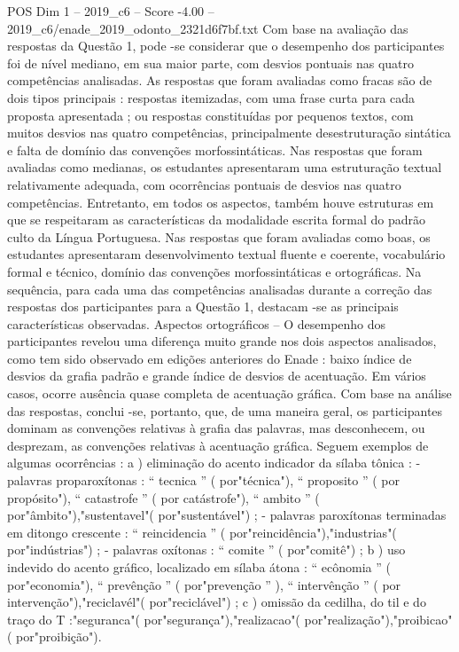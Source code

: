 \begin{textsample}{POS Dim 1 – 2019\_c6 – Score -4.00 – 2019\_c6/enade\_2019\_odonto\_2321d6f7bf.txt}
Com base na avaliação das respostas da Questão 1, pode -se considerar que o desempenho dos participantes foi de nível mediano, em sua maior parte, com desvios pontuais nas quatro competências analisadas.
As respostas que foram avaliadas como fracas são de dois tipos principais : respostas itemizadas, com uma frase curta para cada proposta apresentada ; ou respostas constituídas por pequenos textos, com muitos desvios nas quatro competências, principalmente desestruturação sintática e falta de domínio das convenções morfossintáticas.
Nas respostas que foram avaliadas como medianas, os estudantes apresentaram uma estruturação textual relativamente adequada, com ocorrências pontuais de desvios nas quatro competências.
Entretanto, em todos os aspectos, também houve estruturas em que se respeitaram as características da modalidade escrita formal do padrão culto da Língua Portuguesa.
Nas respostas que foram avaliadas como boas, os estudantes apresentaram desenvolvimento textual fluente e coerente, vocabulário formal e técnico, domínio das convenções morfossintáticas e ortográficas.
Na sequência, para cada uma das competências analisadas durante a correção das respostas dos participantes para a Questão 1, destacam -se as principais características observadas.
Aspectos ortográficos – O desempenho dos participantes revelou uma diferença muito grande nos dois aspectos analisados, como tem sido observado em edições anteriores do Enade : baixo índice de desvios da grafia padrão e grande índice de desvios de acentuação.
Em vários casos, ocorre ausência quase completa de acentuação gráfica.
Com base na análise das respostas, conclui -se, portanto, que, de uma maneira geral, os participantes dominam as convenções relativas à grafia das palavras, mas desconhecem, ou desprezam, as convenções relativas à acentuação gráfica.
Seguem exemplos de algumas ocorrências : a ) eliminação do acento indicador da sílaba tônica : - palavras proparoxítonas : “ tecnica ” ( por"técnica"), “ proposito ” ( por propósito"), “ catastrofe ” ( por catástrofe"), “ ambito ” ( por"âmbito"),"sustentavel"( por"sustentável") ; - palavras paroxítonas terminadas em ditongo crescente : “ reincidencia ” ( por"reincidência"),"industrias"( por"indústrias") ; - palavras oxítonas : “ comite ” ( por"comitê") ; b ) uso indevido do acento gráfico, localizado em sílaba átona : “ ecônomia ” ( por"economia"), “ prevênção ” ( por"prevenção ” ), “ intervênção ” ( por intervenção"),"reciclavél"( por"reciclável") ; c ) omissão da cedilha, do til e do traço do T :"seguranca"( por"segurança"),"realizacao"( por"realização"),"proibicao"( por"proibição").

\end{textsample}
